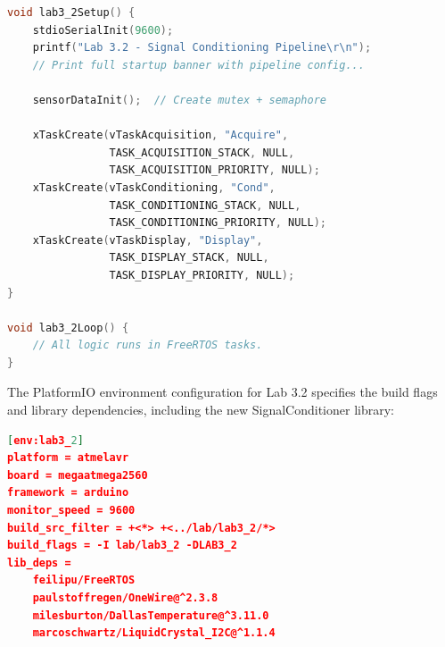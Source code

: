\begin{lstlisting}[language=C++, caption=Lab 3.2 entry point (lab3\_2\_main.cpp --- excerpt), label=lst:lab3_2_main]
void lab3_2Setup() {
    stdioSerialInit(9600);
    printf("Lab 3.2 - Signal Conditioning Pipeline\r\n");
    // Print full startup banner with pipeline config...

    sensorDataInit();  // Create mutex + semaphore

    xTaskCreate(vTaskAcquisition, "Acquire",
                TASK_ACQUISITION_STACK, NULL,
                TASK_ACQUISITION_PRIORITY, NULL);
    xTaskCreate(vTaskConditioning, "Cond",
                TASK_CONDITIONING_STACK, NULL,
                TASK_CONDITIONING_PRIORITY, NULL);
    xTaskCreate(vTaskDisplay, "Display",
                TASK_DISPLAY_STACK, NULL,
                TASK_DISPLAY_PRIORITY, NULL);
}

void lab3_2Loop() {
    // All logic runs in FreeRTOS tasks.
}
\end{lstlisting}

The PlatformIO environment configuration for Lab 3.2 specifies the build flags and library dependencies, including the new SignalConditioner library:

\begin{lstlisting}[language=json, caption=PlatformIO environment for Lab 3.2 (platformio.ini --- excerpt), label=lst:platformio_lab3_2]
[env:lab3_2]
platform = atmelavr
board = megaatmega2560
framework = arduino
monitor_speed = 9600
build_src_filter = +<*> +<../lab/lab3_2/*>
build_flags = -I lab/lab3_2 -DLAB3_2
lib_deps =
    feilipu/FreeRTOS
    paulstoffregen/OneWire@^2.3.8
    milesburton/DallasTemperature@^3.11.0
    marcoschwartz/LiquidCrystal_I2C@^1.1.4
\end{lstlisting}
